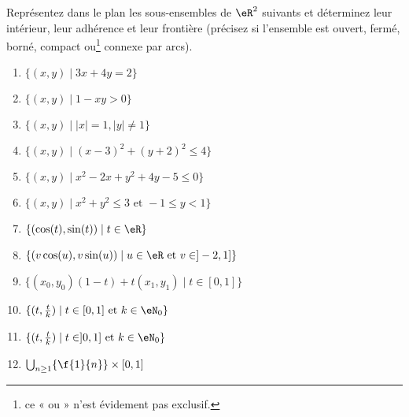 
\begin{exercice}\label{exo0076}

Représentez dans le plan les sous-ensembles de $\eR^2$ suivants et déterminez leur intérieur, leur adhérence et leur frontière (précisez si l'ensemble est ouvert, fermé, borné, compact ou\footnote{ce « ou » n'est évidement pas exclusif.} connexe par arcs).
\begin{enumerate}
\item\label{Item76a} $ \{ (x,y) \mid 3x+4y=2  \} $
\item\label{Item76b}  $ \{ (x,y) \mid 1-xy>0 \} $
\item\label{Item76c}  $ \{ (x,y) \mid |x| =1, |y|\neq1 \} $
\item\label{Item76d}  $ \{ (x,y) \mid (x-3)^2 +(y+2)^2 \leq 4 \} $
\item\label{Item76e}  $ \{ (x,y) \mid x^2 -2x + y^2 + 4y -5 \leq 0 \} $
\item\label{Item76f}  $ \{ (x,y) \mid x^2 + y^2 \leq 3 \mbox{ et } -1 \leq y < 1 \} $
\item\label{Item76g}  $ \{ (\cos(t),\sin(t)) \mid t \in \eR \} $
\item\label{Item76h}  $ \{ (v \cos(u),v \sin(u)) \mid u \in \eR \mbox{ et } v \in ]-2, 1] \}$
\item\label{Item76i}  $ \{ (x_0,y_0)(1-t) + t(x_1,y_1) \mid t\in [0,1] \} $
\item\label{Item76j}  $ \{ (t,\frac{t}{k}) \mid t\in [0,1] \mbox{ et } k\in \eN_0 \} $
\item\label{Item76k}  $ \{ (t,\frac{t}{k}) \mid t\in ]0,1] \mbox{ et } k\in \eN_0 \} $
\item\label{Item76l}  $ \bigcup_{n\geq1}\{\f{1}{n}\}\times[0,1]$
\end{enumerate}

\end{exercice}

